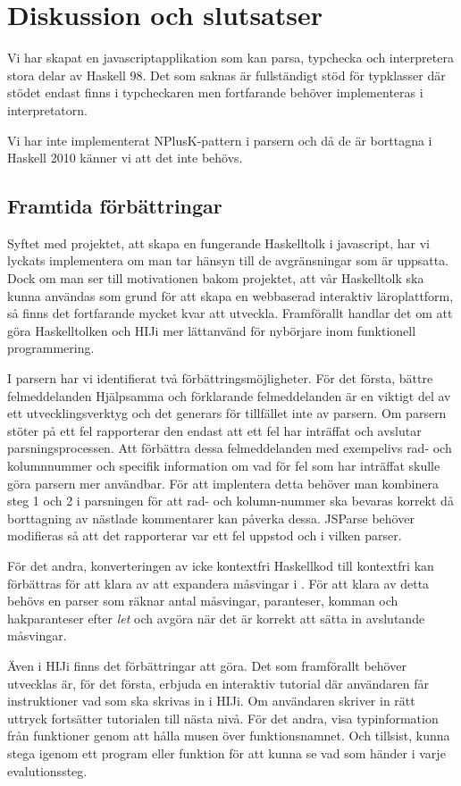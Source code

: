 \section{Diskussion och slutsatser}
Vi har skapat en javascriptapplikation som kan parsa, typchecka och interpretera stora delar av Haskell 98. Det som saknas är fullständigt stöd för typklasser där 
stödet endast finns i typcheckaren men fortfarande behöver implementeras i interpretatorn.

Vi har inte implementerat NPlusK-pattern i parsern och då de är borttagna i Haskell 2010 \citep{haskell2010} känner vi att det inte behövs.



\subsection{Framtida förbättringar}

Syftet med projektet, att skapa en fungerande Haskelltolk i javascript, har vi lyckats implementera om man tar hänsyn till de avgränsningar som är uppsatta. Dock om man ser till motivationen bakom projektet, att vår Haskelltolk ska kunna användas som grund för att skapa en webbaserad interaktiv läroplattform, så finns det fortfarande mycket kvar att utveckla. Framförallt handlar det om att göra Haskelltolken och HIJi mer lättanvänd för nybörjare inom funktionell programmering.

I parsern har vi identifierat två förbättringsmöjligheter. För det första, bättre felmeddelanden
Hjälpsamma och förklarande felmeddelanden är en viktigt del av ett utvecklingsverktyg och det generars för tillfället inte av parsern. 
Om parsern stöter på ett fel rapporterar den endast att ett fel har inträffat och avslutar parsningsprocessen. 
Att förbättra dessa felmeddelanden med exempelivs rad- och kolumnnummer och specifik information om vad för fel som har inträffat skulle göra parsern mer användbar.
För att implentera detta behöver man kombinera steg 1 och 2 i parsningen för att rad- och kolumn-nummer ska bevaras korrekt då borttagning av nästlade kommentarer kan påverka dessa.
JSParse behöver modifieras så att det rapporterar var ett fel uppstod och i vilken parser.

För det andra, konverteringen av icke kontextfri Haskellkod till kontextfri kan förbättras 
för att klara av att expandera måsvingar i \empth{[x | let x = 5]}. 
För att klara av detta behövs en parser som räknar antal måsvingar, paranteser, 
komman och hakparanteser efter \emph{let} och avgöra när det är korrekt att sätta in avslutande måsvingar.

Även i HIJi finns det förbättringar att göra.
Det som framförallt behöver utvecklas är, för det första, erbjuda en interaktiv tutorial där användaren får instruktioner vad som ska skrivas in i HIJi. Om användaren skriver in rätt uttryck fortsätter tutorialen till nästa nivå.
För det andra, visa typinformation från funktioner genom att hålla musen över funktionsnamnet.
Och tillsist, kunna stega igenom ett program eller funktion för att kunna se vad som händer i varje evalutionssteg. 
